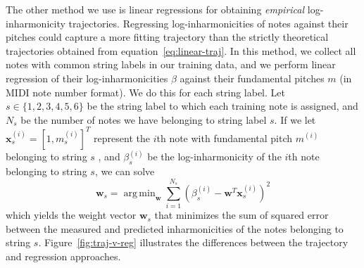 \documentclass[12pt]{cmuthesis}
\DeclareMathOperator*{\argmin}{arg\,min}
\begin{document}
The other method we use is linear regressions for obtaining \textit{empirical} log-inharmonicity trajectories. Regressing log-inharmonicities of notes against their pitches could capture a more fitting trajectory than the strictly theoretical trajectories obtained from equation~\eqref{eq:linear-traj}. In this method, we collect all notes with common string labels in our training data, and we perform linear regression of their log-inharmonicities $\beta$ against their fundamental pitches $m$ (in MIDI note number format). We do this for each string label. Let $s \in \{1,2,3,4,5,6\}$ be the string label to which each training note is assigned, and $N_s$ be the number of notes we have belonging to string label $s$. If we let $\mathbf{x}_s^{(i)} = [1, m_s^{(i)}]^T$ represent the $i$th note with fundamental pitch $m^{(i)}$ belonging to string $s$ , and $\beta_s^{(i)}$ be the log-inharmonicity of the $i$th note belonging to string $s$, we can solve
\begin{equation}
\label{lin-reg}
\mathbf{w}_s = \argmin_{\mathbf{w}}{\sum_{i=1}^{N_s}{(\beta^{(i)}_s - \mathbf{w}^T\mathbf{x}^{(i)}_s)^2}}
\end{equation}
which yields the weight vector $\mathbf{w}_s$ that minimizes the sum of squared error between the measured and predicted inharmonicities of the notes belonging to string $s$. Figure~\ref{fig:traj-v-reg} illustrates the differences between the trajectory and regression approaches.
\end{document}
